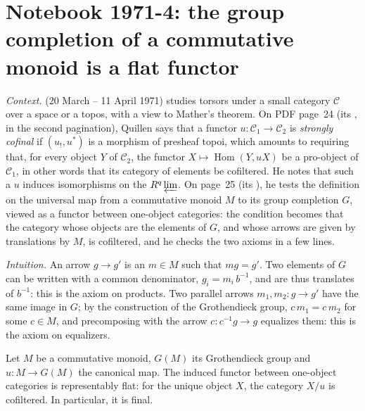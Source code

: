 \section[Notebook 1971-4: a monoid and its Grothendieck group]{Notebook 1971-4: the group completion of a commutative monoid is a flat functor\protect{}}\label{sec:quillen-1971-4}

\emph{Context.}  (20 March -- 11 April 1971) studies torsors under a small category $\mathcal{C}$ over a space or a topos, with a view to Mather's theorem. On PDF page~24 (its , in the second pagination), Quillen says that a functor $u : \mathcal{C}_1 \to \mathcal{C}_2$ is \emph{strongly cofinal} if $(u_!, u^*)$ is a morphism of presheaf topoi, which amounts to requiring that, for every object $Y$ of $\mathcal{C}_2$, the functor $X \mapsto \operatorname{Hom}(Y, uX)$ be a pro-object of $\mathcal{C}_1$, in other words that its category of elements be cofiltered. He notes that such a $u$ induces isomorphisms on the $R^q\varprojlim$. On page~25 (its ), he tests the definition on the universal map from a commutative monoid $M$ to its group completion $G$, viewed as a functor between one-object categories: the condition becomes that the category whose objects are the elements of $G$, and whose arrows are given by translations by $M$, is cofiltered, and he checks the two axioms in a few lines.

\emph{Intuition.} An arrow $g \to g'$ is an $m \in M$ such that $mg = g'$. Two elements of $G$ can be written with a common denominator, $g_i = m_i\,b^{-1}$, and are thus translates of $b^{-1}$: this is the axiom on products. Two parallel arrows $m_1, m_2 : g \to g'$ have the same image in $G$; by the construction of the Grothendieck group, $c\,m_1 = c\,m_2$ for some $c \in M$, and precomposing with the arrow $c : c^{-1}g \to g$ equalizes them: this is the axiom on equalizers.

\begin{encadre}
\begin{theoreme}\label{thm:quillen-1971-4}
Let $M$ be a commutative monoid, $G(M)$ its Grothendieck group and $u : M \to G(M)$ the canonical map. The induced functor between one-object categories is representably flat: for the unique object $X$, the category $X/u$ is cofiltered. In particular, it is final.
\end{theoreme}
\end{encadre}

